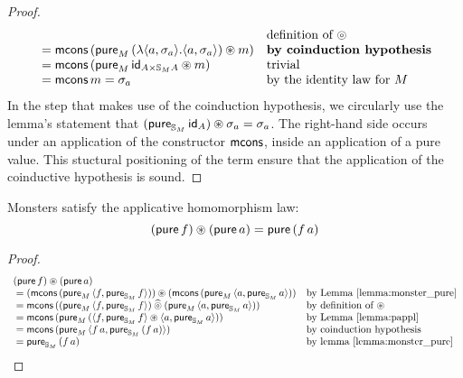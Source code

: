 \begin{proof}
$$\begin{array}{ll}
  & \mbox{definition of }\circledcirc\\
{}= \mathsf{mcons}\,(\mathsf{pure}_M\,(\lambda \langle a,\sigma_a\rangle. \langle a, \sigma_a\rangle) \circledast m)
  & \mbox{\bf by coinduction hypothesis}\\
{}= \mathsf{mcons}\,(\mathsf{pure}_M\,\mathsf{id}_{A\times\mathbb{S}_{M}A} \circledast m)
  & \mbox{trivial}\\
{}= \mathsf{mcons}\,m = \sigma_a
  & \mbox{by the identity law for }M
\end{array}
$$
In the step that makes use of the coinduction hypothesis, we circularly use the lemma's statement that $(\mathsf{pure}_{\mathbb{S}_{M}}\,\mathsf{id}_A) \circledast \sigma_a = \sigma_a$.
The right-hand side occurs under an application of the constructor $\mathsf{mcons}$, inside an application of a pure value. 
This stuctural positioning of the term ensure that the application of the coinductive hypothesis is sound.

\end{proof}

\begin{lemma}
Monsters satisfy the applicative homomorphism law:
$$
(\mathsf{pure}\,f) \circledast (\mathsf{pure}\,a) = \mathsf{pure}\,(f\,a)
$$
\end{lemma}
\begin{proof}
$$
\begin{array}{ll}
(\mathsf{pure}\,f) \circledast (\mathsf{pure}\,a)\\
{}= (\mathsf{mcons}\,(\mathsf{pure}_M\,\langle f, \mathsf{pure}_{\mathbb{S}_{M}}\,f\rangle)) \circledast
    (\mathsf{mcons}\,(\mathsf{pure}_M\,\langle a, \mathsf{pure}_{\mathbb{S}_{M}}\,a\rangle))
  & \mbox{by Lemma \ref{lemma:monster_pure}}\\
{}= \mathsf{mcons}\,((\mathsf{pure}_M\,\langle f, \mathsf{pure}_{\mathbb{S}_{M}}\,f\rangle) \mathbin{\widehat{\circledcirc}}
             (\mathsf{pure}_M\,\langle a, \mathsf{pure}_{\mathbb{S}_{M}}\,a\rangle))
  & \mbox{by definition of }\circledast\\
{}= \mathsf{mcons}\,(\mathsf{pure}_M\,(\langle f, \mathsf{pure}_{\mathbb{S}_{M}}\,f\rangle \circledast \langle a, \mathsf{pure}_{\mathbb{S}_{M}}\,a\rangle))
  & \mbox{by Lemma }\ref{lemma:pappl}\\
{}= \mathsf{mcons}\,(\mathsf{pure}_M\,\langle f\,a, \mathsf{pure}_{\mathbb{S}_{M}}\,(f\,a)\rangle)
  & \mbox{by coinduction hypothesis}\\
{}= \mathsf{pure}_{\mathbb{S}_{M}}\,(f\,a)
  & \mbox{by lemma }\ref{lemma:monster_pure}
\end{array}
$$
\end{proof}

